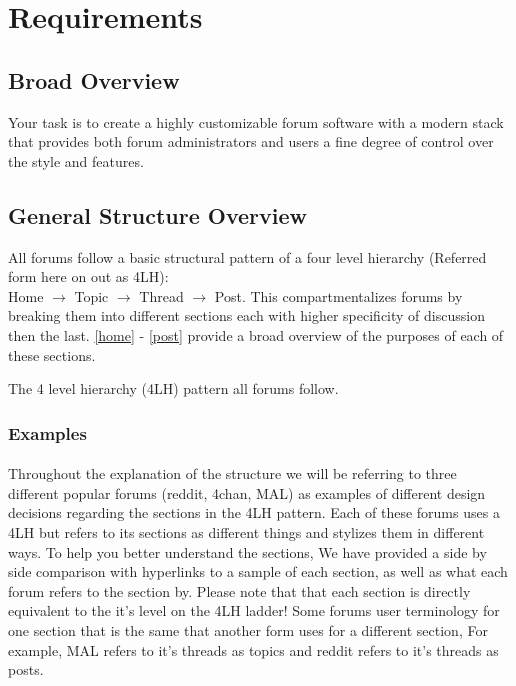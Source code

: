 \documentclass[]{article}
\begin{document}
\section{Requirements}

\subsection{Broad Overview}
Your task is to create a highly customizable forum software with a modern stack that provides both forum administrators and users a fine degree of control over the style and features. 

\subsection{General Structure Overview}
\begin{minipage}{0.65\textwidth}
All forums follow a basic structural pattern of a four level hierarchy (Referred form here on out as 4LH): \\ Home $\to$ Topic $\to$ Thread $\to$ Post. This compartmentalizes forums by breaking them into different sections each with higher specificity of discussion then the last. \ref{home} - \ref{post} provide a broad overview of the purposes of each of these sections.
\end{minipage}%
\hspace{0.5cm}
\vline
\hspace{0.5cm}
\begin{minipage}{0.35\textwidth}
\vspace{0.5 cm}
The 4 level hierarchy (4LH) pattern all forums follow.  
\end{minipage}%

\newpage

\subsubsection{Examples}
\paragraph{}
Throughout the explanation of the structure we will be referring to three different popular forums (reddit, 4chan, MAL) as examples of different design decisions regarding the sections in the 4LH pattern. Each of these forums uses a 4LH but refers to its sections as different things and stylizes them in different ways. To help you better understand the sections, We have provided a side by side comparison with hyperlinks to a sample of each section, as well as what each forum refers to the section by. Please note that that each section is directly equivalent to the it's level on the 4LH ladder! Some forums user terminology for one section that is the same that another form uses for a different section, For example, MAL refers to it's threads as topics and reddit refers to it's threads as posts.
\end{document}
